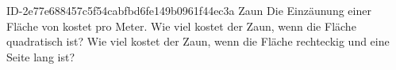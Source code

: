 \begin{exercise}
      {ID-2e77e688457c5f54cabfbd6fe149b0961f44ec3a}
      {Zaun}
  \ifproblem\problem
    Die Einzäunung einer Fläche von  kostet  pro Meter.
    Wie viel kostet der Zaun, wenn die Fläche quadratisch ist?
    Wie viel kostet der Zaun, wenn die Fläche rechteckig und
    eine Seite  lang ist?
  \fi
\end{exercise}

